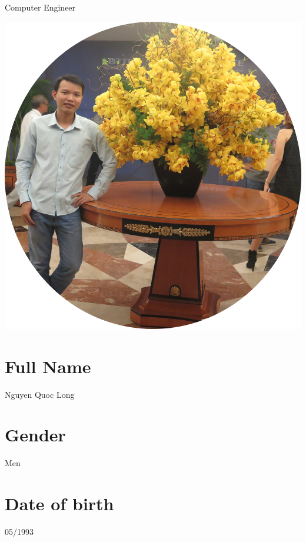 \documentclass[]{friggeri-cv}
\begin{document}
      {Computer Engineer}
      


\begin{aside}
  \includegraphics[scale=0.1]{img/kalog-noedit.jpg}
  \section{Full Name}
Nguyen Quoc Long
  \section{Gender}
Men
  \section{Date of birth}
05/1993
~
~
~
~

\end{aside}
\end{document}
